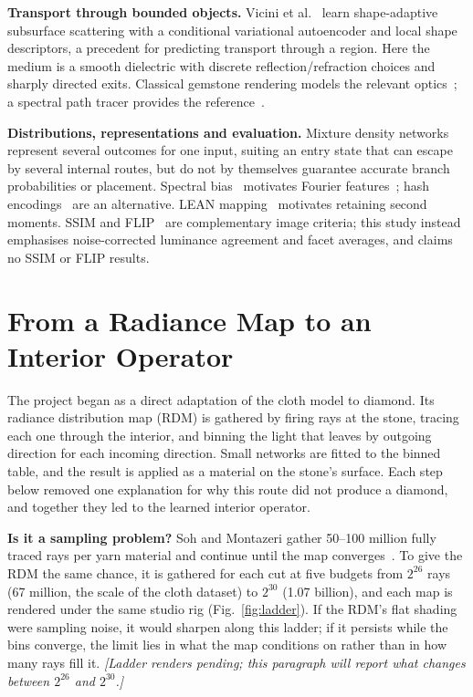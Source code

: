 \documentclass[conference]{IEEEtran}
\begin{document}
\textbf{Transport through bounded objects.} Vicini et
al.~\cite{vicini2019} learn shape-adaptive subsurface scattering with a
conditional variational autoencoder and local shape descriptors, a precedent for
predicting transport through a region. Here the medium is a smooth dielectric
with discrete reflection/refraction choices and sharply directed exits.
Classical gemstone rendering models the relevant optics~\cite{sun2000}; a
spectral path tracer provides the reference~\cite{pharr2023,wilkie2014}.

\textbf{Distributions, representations and evaluation.} Mixture density
networks~\cite{bishop1994} represent several outcomes for one input, suiting an
entry state that can escape by several internal routes, but do not by themselves
guarantee accurate branch probabilities or placement. Spectral
bias~\cite{rahaman2019} motivates Fourier features~\cite{tancik2020}; hash
encodings~\cite{muller2022ngp} are an alternative. LEAN mapping~\cite{olano2010}
motivates retaining second moments. SSIM and FLIP~\cite{wang2004,andersson2020}
are complementary image criteria; this study instead emphasises noise-corrected
luminance agreement and facet averages, and claims no SSIM or FLIP results.

\section{From a Radiance Map to an Interior Operator}
\label{sec:rdm}
The project began as a direct adaptation of the cloth model to diamond. Its
radiance distribution map (RDM) is gathered by firing rays at the stone,
tracing each one through the interior, and binning the light that leaves by
outgoing direction for each incoming direction. Small networks are fitted to
the binned table, and the result is applied as a material on the stone's
surface. Each step below removed one explanation for why this route did not
produce a diamond, and together they led to the learned interior operator.

\textbf{Is it a sampling problem?} Soh and Montazeri gather 50--100 million
fully traced rays per yarn material and continue until the map
converges~\cite{soh2024}. To give the RDM the same chance, it is gathered for
each cut at five budgets from $2^{26}$ rays (67 million, the scale of the cloth
dataset) to $2^{30}$ (1.07 billion), and each map is rendered under the same
studio rig (Fig.~\ref{fig:ladder}). If the RDM's flat shading were sampling
noise, it would sharpen along this ladder; if it persists while the bins
converge, the limit lies in what the map conditions on rather than in how many
rays fill it. \emph{[Ladder renders pending; this paragraph will report what
changes between $2^{26}$ and $2^{30}$.]}
\end{document}
